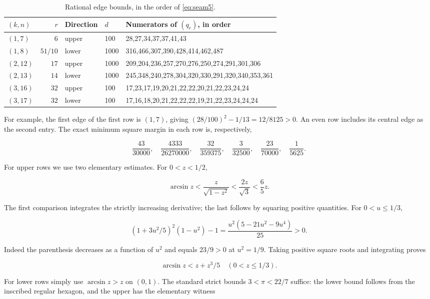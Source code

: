 \begin{table}[htbp]\centering\small
\caption{Rational edge bounds, in the order of \eqref{eq:seam5}.}
\label{tab:seam3}
\setlength{\tabcolsep}{5pt}
\begin{tabularx}{\textwidth}{lrllX}
\toprule
$(k,n)$ & $r$ & Direction & $d$ & Numerators of $(q_e)$, in order \\
\midrule
$(1,7)$ & $6$ & upper & 100 & 28,27,34,37,37,41,43 \\
$(1,8)$ & $51/10$ & lower & 1000 & 316,466,307,390,428,414,462,487 \\
$(2,12)$ & $17$ & upper & 1000 & 209,204,236,257,270,276,250,274,291,301,306 \\
$(2,13)$ & $14$ & lower & 1000 & 245,348,240,278,304,320,330,291,320,340,353,361 \\
$(3,16)$ & $32$ & upper & 100 & 17,23,17,19,20,21,22,22,20,21,22,23,24,24 \\
$(3,17)$ & $32$ & lower & 100 & 17,16,18,20,21,22,22,22,19,21,22,23,24,24,24 \\
\bottomrule
\end{tabularx}
\end{table}

For example, the first edge of the first row is $(1,7)$, giving
$(28/100)^2-1/13=12/8125>0$. An even row includes its central
edge as the second entry. The exact minimum square margin in each row is,
respectively,

\[
 \frac{43}{30000},\quad\frac{4333}{26270000},\quad
 \frac{32}{359375},\quad\frac{3}{32500},\quad
 \frac{23}{70000},\quad\frac{1}{5625}.
 \tag{A.19}\label{eq:seam19}
\]

For upper rows we use two elementary estimates. For $0<z<1/2$,

\[
 \arcsin z<\frac{z}{\sqrt{1-z^2}}<\frac{2z}{\sqrt3}<\frac65z.
 \tag{A.20}\label{eq:seam20}
\]

The first comparison integrates the strictly increasing derivative; the
last follows by squaring positive quantities. For $0<u\le1/3$,

\[
 (1+3u^2/5)^2(1-u^2)-1
 =\frac{u^2(5-21u^2-9u^4)}{25}>0.
\]

Indeed the parenthesis decreases as a function of $u^2$ and equals
$23/9>0$ at $u^2=1/9$. Taking positive square roots and
integrating proves

\[
 \arcsin z<z+z^3/5\quad(0<z\le1/3). \tag{A.21}\label{eq:seam21}
\]

For lower rows simply use $\arcsin z>z$ on $(0,1)$. The standard
strict bounds $3<\pi<22/7$ suffice: the lower bound follows from the
inscribed regular hexagon, and the upper has the elementary witness

